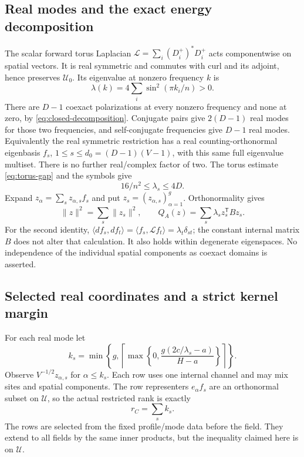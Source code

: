 \subsection{Real modes and the exact energy decomposition}
The scalar forward torus Laplacian
$\mathcal L=\sum_i(D_i^+)^*D_i^+$ acts componentwise on spatial vectors.
It is real symmetric and commutes with curl and its adjoint, hence
preserves $\mathcal U_0$. Its eigenvalue at nonzero frequency $k$ is
\[
 \lambda(k)=4\sum_i\sin^2(\pi k_i/n)>0.
\]
There are $D-1$ coexact polarizations at every nonzero frequency and
none at zero, by \eqref{eq:closed-decomposition}. Conjugate pairs give
$2(D-1)$ real modes for those two frequencies, and self-conjugate
frequencies give $D-1$ real modes. Equivalently the real symmetric
restriction has a real counting-orthonormal eigenbasis
$f_s$, $1\le s\le d_0=(D-1)(V-1)$, with this same full eigenvalue
multiset. There is no further real/complex factor of two.
The torus estimate \eqref{eq:torus-gap} and the symbols give
\[
 16/n^2\le\lambda_s\le4D.
\]
Expand $z_\alpha=\sum_sz_{\alpha,s}f_s$ and put
$z_s=(z_{\alpha,s})_{\alpha=1}^g$. Orthonormality gives
\begin{equation}\label{eq:mode-energy}
 \|z\|^2=\sum_s\|z_s\|^2,\qquad
 Q_A(z)=\sum_s\lambda_s z_s^{\mathsf T}Bz_s.
\end{equation}
For the second identity,
$\langle df_s,df_t\rangle=\langle f_s,\mathcal Lf_t\rangle
=\lambda_t\delta_{st}$; the constant internal matrix $B$ does not
alter that calculation. It also holds within degenerate eigenspaces.
No independence of the individual spatial components as coexact domains
is asserted.

\subsection{Selected real coordinates and a strict kernel margin}
For each real mode let
\begin{equation}\label{eq:mode-selection}
 k_s=\min\left\{g,
 \left\lceil\max\left\{0,\frac{g(2c/\lambda_s-a)}{H-a}\right\}\right\rceil
 \right\}.
\end{equation}
Observe $V^{-1/2}z_{\alpha,s}$ for $\alpha\le k_s$.
Each row uses one internal channel and may mix sites and spatial components.
The row representers $e_\alpha f_s$ are an orthonormal subset on
$\mathcal U$, so the actual restricted rank is exactly
\begin{equation}\label{eq:selected-rank}
 r_C=\sum_sk_s.
\end{equation}
The rows are selected from the fixed profile/mode data before the field.
They extend to all fields by the same inner products, but the inequality
claimed here is on $\mathcal U$.

